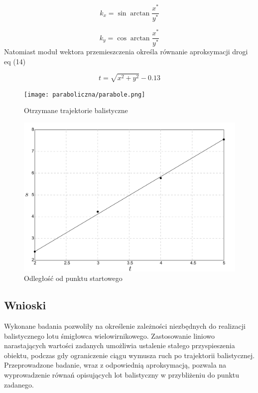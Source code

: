 \documentclass[polish,11pt,a4paper]{article}
\begin{document}
\begin{equation}
	k_{x} = \sin \arctan \frac{x^{*}}{y^{*}}
\end{equation}

\begin{equation}
	k_{y} = \cos \arctan \frac{x^{*}}{y^{*}}
\end{equation}
Natomiast moduł wektora przemieszczenia określa równanie aproksymacji drogi eq (14)

\begin{equation}
	t = \sqrt{x^{2}+y^{2}} - 0.13
\end{equation}

\begin{figure}[H]
	\centering
	\texttt{[image: paraboliczna/parabole.png]}
	\caption{Otrzymane trajektorie balistyczne}
\end{figure}

\begin{figure}[H]
	\centering
	\includegraphics[width=\linewidth]{paraboliczna/st.png}
	\caption{Odległość od punktu startowego}
\end{figure}

\subsection*{Wnioski}
Wykonane badania pozwoliły na określenie zależności niezbędnych do realizacji balistycznego lotu śmigłowca wielowirnikowego. Zastosowanie liniowo narastających wartości zadanych umożliwia ustalenie stałego przyspieszenia obiektu, podczas gdy ograniczenie ciągu wymusza ruch po trajektorii balistycznej. Przeprowadzone badanie, wraz z odpowiednią aproksymacją, pozwala na wyprowadzenie równań opisujących lot balistyczny w przybliżeniu do punktu zadanego.
\end{document}
